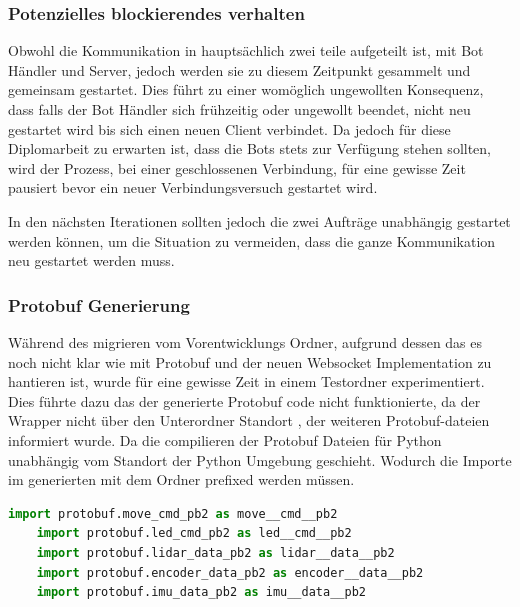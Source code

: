 \subsubsection{Potenzielles blockierendes verhalten}
Obwohl die Kommunikation in hauptsächlich zwei  teile aufgeteilt ist, mit 
Bot Händler und Server, 
jedoch werden sie zu diesem Zeitpunkt gesammelt und gemeinsam gestartet.
Dies führt zu einer womöglich ungewollten Konsequenz,
dass falls der Bot Händler sich frühzeitig oder ungewollt beendet, 
nicht neu gestartet wird bis sich einen neuen Client verbindet.
% 
Da jedoch für diese Diplomarbeit zu erwarten ist, 
dass die Bots stets zur Verfügung stehen sollten,
wird der Prozess, bei einer geschlossenen Verbindung,
für eine gewisse Zeit pausiert bevor ein neuer Verbindungsversuch gestartet wird.

In den nächsten Iterationen sollten jedoch 
die zwei Aufträge unabhängig gestartet werden können, 
um die Situation zu vermeiden, dass die ganze Kommunikation neu gestartet werden muss.

\subsubsection{Protobuf Generierung}
Während des migrieren vom Vorentwicklungs Ordner, 
aufgrund dessen das es noch nicht klar wie mit Protobuf 
und der neuen Websocket Implementation zu hantieren ist, 
wurde für eine gewisse Zeit in einem Testordner experimentiert.
Dies führte dazu das der generierte Protobuf code nicht funktionierte,
da der Wrapper nicht über den Unterordner Standort , 
der weiteren Protobuf-dateien informiert wurde.
Da die compilieren der Protobuf Dateien für Python unabhängig vom Standort
der Python Umgebung geschieht. 
Wodurch die Importe im generierten 
mit dem Ordner prefixed werden müssen.

\begin{lstlisting}[language=python, gobble=4]
    import protobuf.move_cmd_pb2 as move__cmd__pb2
    import protobuf.led_cmd_pb2 as led__cmd__pb2
    import protobuf.lidar_data_pb2 as lidar__data__pb2
    import protobuf.encoder_data_pb2 as encoder__data__pb2
    import protobuf.imu_data_pb2 as imu__data__pb2
\end{lstlisting}



